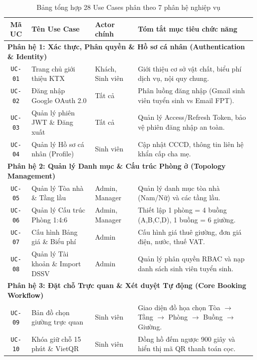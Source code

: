 \documentclass[12pt,a4paper,oneside]{report}
\begin{document}
\begin{table}[htbp]
\centering
\caption{Bảng tổng hợp 28 Use Cases phân theo 7 phân hệ nghiệp vụ}
\label{tab:usecases_summary_allinone}
\footnotesize
\begin{tabularx}{\textwidth}{|c|l|l|X|}
\hline
\rowcolor{blue!10}
\textbf{Mã UC} & \textbf{Tên Use Case} & \textbf{Actor chính} & \textbf{Tóm tắt mục tiêu chức năng} \\ \hline
\multicolumn{4}{|l|}{\textbf{Phân hệ 1: Xác thực, Phân quyền \& Hồ sơ cá nhân (Authentication \& Identity)}} \\ \hline
\texttt{UC-01} & Trang chủ giới thiệu KTX & Khách, Sinh viên & Giới thiệu cơ sở vật chất, biểu phí dịch vụ, nội quy chung. \\ \hline
\texttt{UC-02} & Đăng nhập Google OAuth 2.0 & Tất cả & Phân luồng đăng nhập (Gmail sinh viên tuyển sinh vs Email FPT). \\ \hline
\texttt{UC-03} & Quản lý phiên JWT \& Đăng xuất & Tất cả & Quản lý Access/Refresh Token, bảo vệ phiên đăng nhập an toàn. \\ \hline
\texttt{UC-04} & Quản lý Hồ sơ cá nhân (Profile) & Sinh viên & Cập nhật CCCD, thông tin liên hệ khẩn cấp cha mẹ. \\ \hline
\multicolumn{4}{|l|}{\textbf{Phân hệ 2: Quản lý Danh mục \& Cấu trúc Phòng ở (Topology Management)}} \\ \hline
\texttt{UC-05} & Quản lý Tòa nhà \& Tầng lầu & Admin, Manager & Quản lý danh mục tòa nhà (Nam/Nữ) và các tầng lầu. \\ \hline
\texttt{UC-06} & Quản lý Cấu trúc Phòng 1:4:6 & Admin, Manager & Thiết lập 1 phòng = 4 buồng (A,B,C,D), 1 buồng = 6 giường. \\ \hline
\texttt{UC-07} & Cấu hình Bảng giá \& Biểu phí & Admin & Cấu hình giá thuê giường, đơn giá điện, nước, thuế VAT. \\ \hline
\texttt{UC-08} & Quản lý Tài khoản \& Import DSSV & Admin & Quản lý phân quyền RBAC và nạp danh sách sinh viên tuyển sinh. \\ \hline
\multicolumn{4}{|l|}{\textbf{Phân hệ 3: Đặt chỗ Trực quan \& Xét duyệt Tự động (Core Booking Workflow)}} \\ \hline
\texttt{UC-09} & Bản đồ chọn giường trực quan & Sinh viên & Giao diện đồ họa chọn Tòa $\rightarrow$ Tầng $\rightarrow$ Phòng $\rightarrow$ Buồng $\rightarrow$ Giường. \\ \hline
\texttt{UC-10} & Khóa giữ chỗ 15 phút \& VietQR & Sinh viên & Đồng hồ đếm ngược 900 giây và hiển thị mã QR thanh toán cọc. \\ \hline

\end{tabularx}
\end{table}
\end{document}
